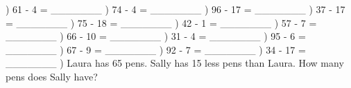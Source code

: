 \documentclass{article}%
\begin{document}
) 61 {-} 4 = \_\_\_\_\_\_\_%
\newline%
\newline%
) 74 {-} 4 = \_\_\_\_\_\_\_%
\newline%
\newline%
) 96 {-} 17 = \_\_\_\_\_\_\_%
\newline%
\newline%
) 37 {-} 17 = \_\_\_\_\_\_\_%
\newline%
\newline%
) 75 {-} 18 = \_\_\_\_\_\_\_%
\newline%
\newline%
) 42 {-} 1 = \_\_\_\_\_\_\_%
\newline%
\newline%
) 57 {-} 7 = \_\_\_\_\_\_\_%
\newline%
\newline%
) 66 {-} 10 = \_\_\_\_\_\_\_%
\newline%
\newline%
) 31 {-} 4 = \_\_\_\_\_\_\_%
\newline%
\newline%
) 95 {-} 6 = \_\_\_\_\_\_\_%
\newline%
\newline%
) 67 {-} 9 = \_\_\_\_\_\_\_%
\newline%
\newline%
) 92 {-} 7 = \_\_\_\_\_\_\_%
\newline%
\newline%
) 34 {-} 17 = \_\_\_\_\_\_\_%
\newline%
\newline%
) Laura has 65 pens. Sally has 15 less pens than Laura. How many pens does Sally have?%
\newline%
\newline%
\newline%
\end{document}
